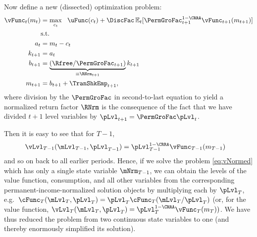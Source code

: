 \documentclass[titlepage, headings=optiontotocandhead]{Resources/texmf-local/tex/latex/econtex}
\begin{document}
Now define a new (dissected) optimization problem:
  \begin{equation}\begin{gathered}\begin{aligned}
        {\vFunc}_{t}({m}_{t}) & = \max_{{c}_{t}} ~~ \uFunc({c}_{t})+
        {\DiscFac}\Ex_{t}[ \PermGroFac_{t+1}^{1-\CRRA}{\vFunc}_{t+1}({m}_{t+1})] \label{eq:vNormed}                   \\
                                         & \text{s.t.}                                                                                 \\
        {a}_{t}                       & = {m}_{t}-{c}_{t}                                                                     \\
        {k}_{t+1}                     & = {a}_{t}                                                                                \\
        {b}_{t+1}                     & = \underbrace{\left(\Rfree/\PermGroFac_{t+1}\right)}_{\equiv \RNrm_{t+1}}{k}_{t+1} \\
        {m}_{t+1}                        & = {b}_{t+1}+\TranShkEmp_{t+1},
      \end{aligned}\end{gathered}\end{equation}
where division by the $\PermGroFac$ in second-to-last equation to yield a normalized return factor $\RNrm$ is the consequence of the fact that we have divided $t+1$ level variables by $\pLvl_{t+1}=\PermGroFac\pLvl_{t}$.

Then it is easy to see that for $T-1$, 
\begin{equation*}\begin{gathered}\begin{aligned}
      {\vLvl}_{T-1}(\mLvl_{T-1},\pLvl_{T-1}) & =  \pLvl_{T-1}^{1-\CRRA}{\vFunc}_{T-1}({m}_{T-1})
    \end{aligned}\end{gathered}\end{equation*}
and so on back to all earlier periods.  Hence, if we solve the problem \eqref{eq:vNormed} which has only a single state variable $\mNrm_{T-1}$, we can obtain the levels of the value function, consumption, and all other variables from the corresponding permanent-income-normalized solution objects by multiplying each by $\pLvl_{T}$, e.g.\ ${\cFunc}_{T}(\mLvl_{T},\pLvl_{T})=\pLvl_{T}\cFunc_{T}(\mLvl_{T}/\pLvl_{T})$ (or, for the value function, ${\vLvl} _{T}({\mLvl}_{T},\pLvl_{T}) = \pLvl_{T}^{1-\CRRA}\vFunc_{T}({m}_{T}))$.  We have thus reduced the problem from two continuous state variables to one (and thereby enormously simplified its solution).
\end{document}
